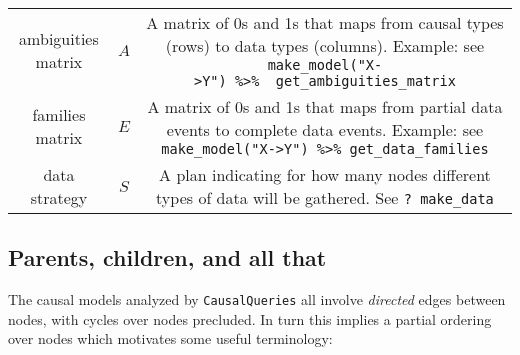 \documentclass[
  12pt,
]{book}
\begin{document}
\begin{longtable}[]{@{}ccc@{}}
\begin{minipage}[t]{0.20\columnwidth}
ambiguities matrix\strut
\end{minipage} & \begin{minipage}[t]{0.15\columnwidth}\centering
\(A\)\strut
\end{minipage} & \begin{minipage}[t]{0.57\columnwidth}\centering
A matrix of 0s and 1s that maps from causal types (rows) to data types (columns). Example: see \texttt{make\_model("X-\textgreater{}Y")\ \%\textgreater{}\%\ \ get\_ambiguities\_matrix}\strut
\end{minipage}\tabularnewline
\begin{minipage}[t]{0.20\columnwidth}\centering
families matrix\strut
\end{minipage} & \begin{minipage}[t]{0.15\columnwidth}\centering
\(E\)\strut
\end{minipage} & \begin{minipage}[t]{0.57\columnwidth}\centering
A matrix of 0s and 1s that maps from partial data events to complete data events. Example: see \texttt{make\_model("X-\textgreater{}Y")\ \%\textgreater{}\%\ get\_data\_families}\strut
\end{minipage}\tabularnewline
\begin{minipage}[t]{0.20\columnwidth}\centering
data strategy\strut
\end{minipage} & \begin{minipage}[t]{0.15\columnwidth}\centering
\(S\)\strut
\end{minipage} & \begin{minipage}[t]{0.57\columnwidth}\centering
A plan indicating for how many nodes different types of data will be gathered. See \texttt{?\ make\_data}\strut
\end{minipage}\tabularnewline
\bottomrule
\end{longtable}

\hypertarget{parents}{%
\subsection{Parents, children, and all that}\label{parents}}

The causal models analyzed by \texttt{CausalQueries} all involve \emph{directed} edges between nodes, with cycles over nodes precluded. In turn this implies a partial ordering over nodes which motivates some useful terminology:
\end{document}
